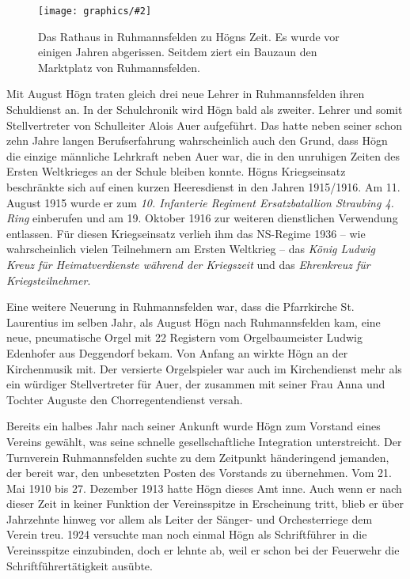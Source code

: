 \documentclass{book}
\newcommand{\img}[2][width=\linewidth]{\noindent\texttt{[image: graphics/\#2]}}
\begin{document}
\begin{figure}
\img{Rathaus-von-Ruhmannsfelden}
\caption{Das Rathaus in Ruhmannsfelden zu Högns Zeit. Es wurde vor
einigen Jahren abgerissen. Seitdem ziert ein Bauzaun den Marktplatz von
Ruhmannsfelden.}
\end{figure}

Mit August Högn traten gleich drei neue Lehrer in Ruhmannsfelden ihren
Schuldienst an. In der Schulchronik wird Högn bald als zweiter. Lehrer
und somit Stellvertreter von Schulleiter Alois Auer aufgeführt. Das
hatte neben seiner schon zehn Jahre langen Berufserfahrung
wahrscheinlich auch den Grund, dass Högn die einzige männliche
Lehrkraft neben Auer war, die in den unruhigen Zeiten des Ersten
Weltkrieges an der Schule bleiben konnte. Högns Kriegseinsatz
beschränkte sich auf einen kurzen Heeresdienst in den Jahren 1915/1916.
Am 11. August 1915 wurde er zum \textit{10. Infanterie Regiment
Ersatzbatallion Straubing 4. Ring} einberufen und am 19. Oktober 1916
zur weiteren dienstlichen Verwendung entlassen. Für diesen
Kriegseinsatz verlieh ihm das NS-Regime 1936 – wie wahrscheinlich
vielen Teilnehmern am Ersten Weltkrieg – das \textit{König Ludwig
Kreuz für Heimatverdienste während der Kriegszeit} und das
\textit{Ehrenkreuz für Kriegsteilnehmer}.

Eine weitere Neuerung in Ruhmannsfelden war, dass die Pfarrkirche St.
Laurentius im selben Jahr, als August Högn nach Ruhmannsfelden kam,
eine neue, pneumatische Orgel mit 22 Registern vom Orgelbaumeister
Ludwig Edenhofer aus Deggendorf bekam. Von Anfang an wirkte Högn an der
Kirchenmusik mit. Der versierte Orgelspieler war auch im
Kirchendienst mehr als ein würdiger Stellvertreter für Auer, der
zusammen mit seiner Frau Anna und Tochter Auguste den
Chorregentendienst versah.

Bereits ein halbes Jahr nach seiner Ankunft wurde Högn zum Vorstand
eines Vereins gewählt, was seine schnelle gesellschaftliche Integration
unterstreicht. Der Turnverein Ruhmannsfelden suchte zu dem Zeitpunkt
händeringend jemanden, der bereit war, den unbesetzten Posten des
Vorstands zu übernehmen. Vom 21. Mai 1910 bis 27. Dezember 1913 hatte
Högn dieses Amt inne. Auch wenn er nach dieser Zeit in keiner Funktion
der Vereinsspitze in Erscheinung tritt, blieb er über Jahrzehnte hinweg
vor allem als Leiter der Sänger- und Orchesterriege dem Verein treu.
1924 versuchte man noch einmal Högn als Schriftführer in die
Vereinsspitze einzubinden, doch er lehnte ab, weil er schon bei der
Feuerwehr die Schriftführertätigkeit ausübte.
\end{document}
